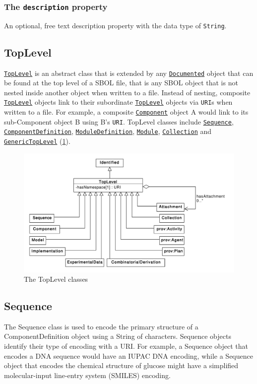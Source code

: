 \documentclass[draftspec]{sbmlpkgspec}
\newcommand{\sbolheading}[1]{\texttt{#1}}
\newcommand{\sbol}[1]{\texttt{\hyperref[sec:#1]{#1}}}
\newcommand{\external}[1]{\texttt{#1}}
\begin{document}
\subsubsection*{The \sbolheading{description} property}
\label{sec:description}
An optional, free text description property with the data type of \external{String}.




\subsection {TopLevel}
\label{sec:TopLevel}
\sbol{TopLevel} is an abstract class that is extended by any \sbol{Documented} object that can be found at the top level of a SBOL file, that is any SBOL object that is not nested inside another object when written to a file. Instead of nesting, composite \sbol{TopLevel} objects link to their subordinate \sbol{TopLevel} objects via \external{URI}s when written to a file. For example, a composite \sbol{Component} object A would link to its sub-Component object B using B's \external{URI}. TopLevel classes include \sbol{Sequence}, \sbol{ComponentDefinition}, \sbol{ModuleDefinition}, \sbol{Module}, \sbol{Collection} and \sbol{GenericTopLevel} (\ref{uml:toplevel}).

\begin{figure}[ht]
\begin{center}
\includegraphics[width=\textwidth]{uml/toplevel}
\caption[]{The TopLevel classes}
\label{uml:toplevel}
\end{center}
\end{figure}




\subsection{Sequence}
\label{sec:Sequence}
The Sequence class is used to encode the primary structure of a ComponentDefinition object using a String of characters. Sequence objects identify their type of encoding with a URI. For example, a Sequence object that encodes a DNA sequence would have an IUPAC DNA encoding, while a Sequence object that encodes the chemical structure of glucose might have a simplified molecular-input line-entry system (SMILES) encoding. 
\end{document}
